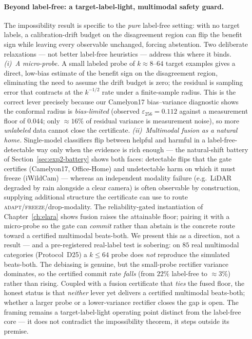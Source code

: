 \paragraph{Beyond label-free: a target-label-light, multimodal safety guard.}
The impossibility result is specific to the \emph{pure} label-free setting: with no
target labels, a calibration-drift budget on the disagreement region can flip the
benefit sign while leaving every observable unchanged, forcing abstention.  Two
deliberate relaxations --- not better label-free heuristics --- address this where it
binds.  \emph{(i)~A micro-probe.}  A small labeled probe of $k{\approx}8$--$64$ target
examples gives a direct, low-bias estimate of the benefit sign on the disagreement
region, eliminating the need to assume the drift budget is zero; the residual is
sampling error that contracts at the $k^{-1/2}$ rate under a finite-sample radius.
This is the correct lever precisely because our Camelyon17 bias--variance diagnostic
shows the conformal radius is \emph{bias-limited} (observed $\varepsilon_{256}{=}0.112$
against a measurement floor of $0.044$; only ${\approx}16\%$ of residual variance is
measurement noise), so more \emph{unlabeled} data cannot close the certificate.
\emph{(ii)~Multimodal fusion as a natural home.}  Single-model classifiers flip
between helpful and harmful in a label-free-detectable way only when the evidence is
rich enough --- the natural-shift battery of Section~\ref{sec:exp2-battery} shows both
faces: detectable flips that the gate certifies (Camelyon17, Office-Home) and
undetectable harm on which it must freeze (iWildCam) --- whereas an independent
modality failure (e.g.\ LiDAR degraded by rain alongside a clear camera) is often
observable by construction, supplying additional structure the certificate can use to
route \textsc{adapt}/\textsc{freeze}/drop-modality.  The reliability-gated instantiation of
Chapter~\ref{ch:elara} shows fusion raises the attainable floor; pairing it with a
micro-probe so the gate can \emph{commit} rather than abstain is the concrete route
toward a certified multimodal beats-both.  We present this as a direction, not a
result --- and a pre-registered real-label test is sobering: on $85$ real multimodal
categories (Protocol~D25) a $k{\le}64$ probe does \emph{not} reproduce the
simulated beats-both.  The debiasing is genuine, but the small-probe rectifier
variance dominates, so the certified commit rate \emph{falls} (from $22\%$ label-free
to ${\approx}3\%$) rather than rising.  Coupled with a fusion certificate that
\emph{ties} the fused floor, the honest status is that \emph{neither} lever yet
delivers a certified multimodal beats-both; whether a larger probe or a
lower-variance rectifier closes the gap is open.  The framing remains a
target-label-light operating point distinct from the label-free core --- it does not
contradict the impossibility theorem, it steps outside its premise.

